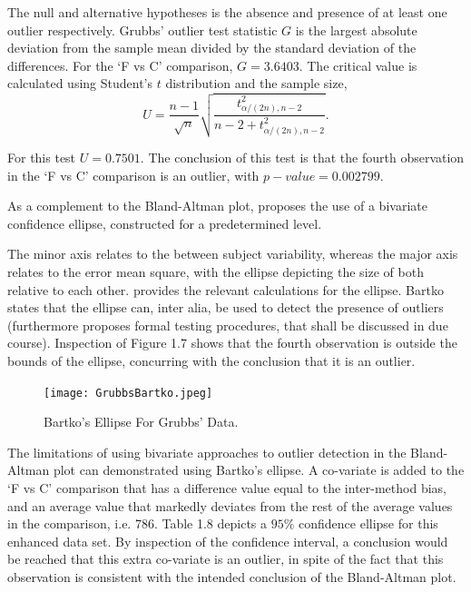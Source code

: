 \documentclass[12pt, a4paper]{report}
\begin{document}
The null and alternative hypotheses is the absence and presence of
at least one outlier respectively. Grubbs' outlier test statistic
$G$ is the largest absolute deviation from the sample mean divided
by the standard deviation of the differences. For the `F vs C'
comparison, $G = 3.6403$. The critical value is calculated using
Student's $t$ distribution and the sample size,
\begin{equation}
U = \frac{n-1}{\sqrt{n}} \sqrt{\frac{t_{\alpha/(2n),n-2}^2}{n - 2
+ t_{\alpha/(2n),n-2}^2}}.
\end{equation}

For this test $U = 0.7501$. The conclusion of this test is that
the fourth observation in the `F vs C' comparison is an outlier,
with $p-value = 0.002799$.

As a complement to the Bland-Altman plot, \citet{Bartko} proposes
the use of a bivariate confidence ellipse, constructed for a
predetermined level.

The minor axis relates to the between subject variability, whereas
the major axis relates to the error mean square, with the ellipse
depicting the size of both relative to each
other.\citet{AltmanEllipse} provides the relevant calculations for
the ellipse. Bartko states that the ellipse can, inter alia, be
used to detect the presence of outliers (furthermore
\citet{Bartko} proposes formal testing procedures, that shall be
discussed in due course). Inspection of Figure 1.7 shows that the
fourth observation is outside the bounds of the ellipse,
concurring with the conclusion that it is an outlier.


\begin{figure}[h!]
  \texttt{[image: GrubbsBartko.jpeg]}
  \caption{Bartko's Ellipse For Grubbs' Data.}\label{GrubbsBartko}
\end{figure}

The limitations of using bivariate approaches to outlier detection
in the Bland-Altman plot can demonstrated using Bartko's ellipse.
A co-variate is added to the `F vs C' comparison that has a
difference value equal to the inter-method bias, and an average
value that markedly deviates from the rest of the average values
in the comparison, i.e. 786. Table 1.8 depicts a $95\%$ confidence
ellipse for this enhanced data set. By inspection of the
confidence interval, a conclusion would be reached that this extra
co-variate is an outlier, in spite of the fact that this
observation is consistent with the intended conclusion of the
Bland-Altman plot.
\end{document}
